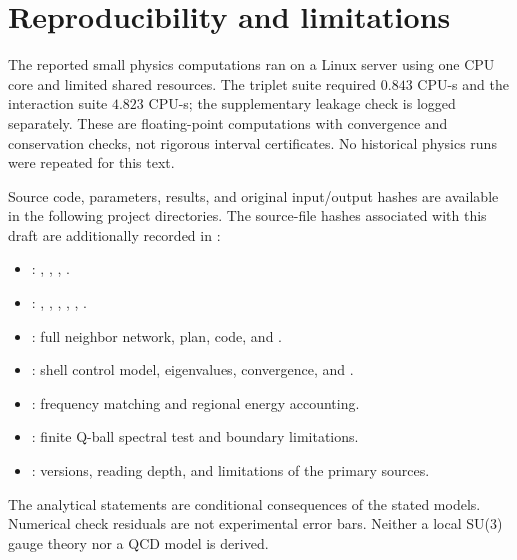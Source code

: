 \documentclass[a4paper,11pt]{article}
\begin{document}
\section{Reproducibility and limitations}\label{sec:reproducibility}
The reported small physics computations ran on a Linux server using one CPU core and limited shared resources. The triplet suite required $0.843$ CPU-s and the interaction suite $4.823$ CPU-s; the supplementary leakage check is logged separately. These are floating-point computations with convergence and conservation checks, not rigorous interval certificates. No historical physics runs were repeated for this text.

Source code, parameters, results, and original input/output hashes are available in the following project directories. The source-file hashes associated with this draft are additionally recorded in :
\begin{itemize}
\item {}: , , , .
\item {}: , , , , , .
\item {}: full neighbor network, plan, code, and .
\item {}: shell control model, eigenvalues, convergence, and .
\item {}: frequency matching and regional energy accounting.
\item {}: finite Q-ball spectral test and boundary limitations.
\item {}: versions, reading depth, and limitations of the primary sources.
\end{itemize}
The analytical statements are conditional consequences of the stated models. Numerical check residuals are not experimental error bars. Neither a local SU(3) gauge theory nor a QCD model is derived.
\end{document}
